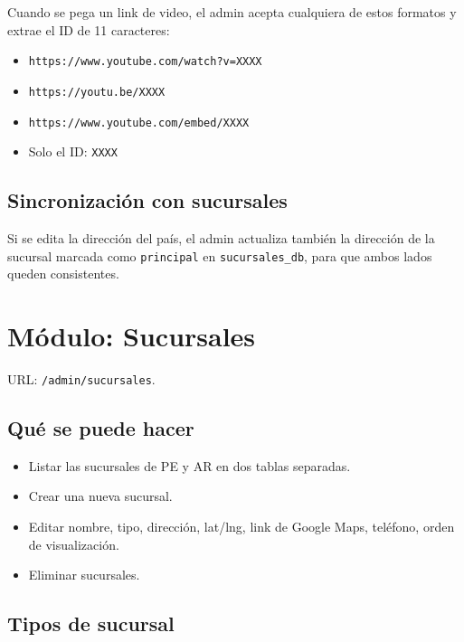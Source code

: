 \documentclass[11pt,a4paper]{article}
\begin{document}
Cuando se pega un link de video, el admin acepta cualquiera de estos
formatos y extrae el ID de 11 caracteres:

\begin{itemize}[leftmargin=*]
    \item \texttt{https://www.youtube.com/watch?v=XXXX}
    \item \texttt{https://youtu.be/XXXX}
    \item \texttt{https://www.youtube.com/embed/XXXX}
    \item Solo el ID: \texttt{XXXX}
\end{itemize}

\subsection{Sincronización con sucursales}

Si se edita la dirección del país, el admin actualiza también la dirección
de la sucursal marcada como \texttt{principal} en \texttt{sucursales\_db},
para que ambos lados queden consistentes.

\section{Módulo: Sucursales}

URL: \texttt{/admin/sucursales}.

\subsection{Qué se puede hacer}

\begin{itemize}[leftmargin=*]
    \item Listar las sucursales de PE y AR en dos tablas separadas.
    \item Crear una nueva sucursal.
    \item Editar nombre, tipo, dirección, lat/lng, link de Google Maps,
        teléfono, orden de visualización.
    \item Eliminar sucursales.
\end{itemize}

\subsection{Tipos de sucursal}
\end{document}
